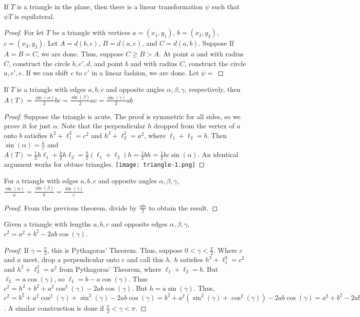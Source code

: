 \documentclass[crop=false,class=article,oneside]{standalone}
\begin{document}
        \begin{theorem}
        If $T$ is a triangle in the plane, then there is a linear transformation $\psi$ such that $\psi T$ is equilateral.
        \end{theorem}
        \begin{proof}
        For let $T$ be a triangle with vertices $a=(x_1,y_1)$, $b=(x_2,y_2)$, $c=(x_3,y_3)$. Let $A = d(b,c)$, $B=d(a,c)$, and $C=d(a,b)$. Suppose If $A=B=C$, we are done. Thus, suppose $C\geq B >A$. At point $a$ and with radius $C$, construct the circle $b,c',d$, and point $b$ and with radius $C$, construct the circle $a,c',e$. If we can shift $c$ to $c'$ in a linear fashion, we are done. Let $\psi =$
        \end{proof}
        \begin{theorem}
        If $T$ is a triangle with edges $a,b,c$ and opposite angles $\alpha,\beta,\gamma$, respectively, then $A(T) = \frac{\sin(\alpha)}{2}bc = \frac{\sin(\beta)}{2}ac = \frac{\sin(\gamma)}{2}ab$
        \end{theorem}
        \begin{proof}
        Suppose the triangle is acute. The proof is symmetric for all sides, so we prove it for just $\alpha$. Note that the perpendicular $h$ dropped from the vertex of $a$ onto $b$ satisfies $h^2+\ell_1^2 = c^2$ and $h^2+\ell_2^2 = a^2$, where $\ell_1+\ell_2 = b$. Then $\sin(\alpha) = \frac{h}{c}$ and $A(T) = \frac{1}{2}h\ell_1 + \frac{h}{2}h\ell_2 = \frac{h}{2}(\ell_1+\ell_2)h = \frac{1}{2}bh = \frac{1}{2}bc\sin(\alpha)$. An identical argument works for obtuse triangles.
        \texttt{[image: triangle-1.png]}
        \end{proof}
        \begin{corollary}
        For a triangle with edges $a,b,c$ and opposite angles $\alpha,\beta,\gamma$, $\frac{\sin(\alpha)}{a} = \frac{\sin(\beta)}{b} = \frac{\sin(\gamma)}{c}$
        \end{corollary}
        \begin{proof}
        From the previous theorem, divide by $\frac{abc}{2}$ to obtain the result.
        \end{proof}
        \begin{theorem}
        Given a triangle with lengths $a,b,c$ and opposite edges $\alpha,\beta,\gamma$, $c^2=a^2+b^2-2ab\cos(\gamma)$.
        \end{theorem}
        \begin{proof}
        If $\gamma=\frac{\pi}{2}$, this is Pythagoras' Theorem. Thus, suppose $0<\gamma < \frac{\pi}{2}$. Where $c$ and $a$ meet, drop a perpendicular onto $c$ and call this $h$. $h$ satisfies $h^2+\ell_1^2 = c^2$ and $h^2+\ell_2^2=a^2$ from Pythagoras' Theorem, where $\ell_1+\ell_2 = b$. But $\ell_2 = a\cos(\gamma)$, so $\ell_1 = b-a\cos(\gamma)$. Thus $c^2 = h^2 + b^2 +a^2\cos^2(\gamma)-2ab\cos(\gamma)$. But $h = a\sin(\gamma)$. Thus, $c^2 = b^2 + a^2 \cos^2(\gamma)+\sin^2(\gamma)-2ab\cos(\gamma) = b^2 + a^2(\sin^2(\gamma)+\cos^2(\gamma))-2ab\cos(\gamma) = a^2 + b^2 -2ab\cos(\gamma)$. A similar construction is done if $\frac{\pi}{2}<\gamma < \pi$.
        \end{proof}
\end{document}
